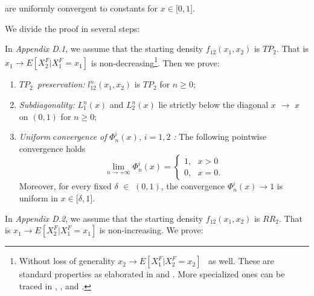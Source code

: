 \documentclass[onecolumn]{article}
\begin{document}
are uniformly convergent to constants for $x\in \lbrack 0,1]$.

We divide the proof in several steps:

In \textit{Appendix D.1}, we assume that the starting density $%
f_{12}(x_{1},x_{2})$ is $TP_{2}$. That is $x_{1}\rightarrow
E[X_{2}^{F}|X_{1}^{F}=x_{1}]$ is non-decreasing\footnote{{\footnotesize %
Without loss of generality }$x_{2}\rightarrow E[X_{1}^{F}|X_{2}^{F}=x_{2}]$%
{\footnotesize \ as well. These are standard properties as elaborated in 
\cite{[36]} and \cite{[38]}. More specialized ones can be traced in \cite%
{[32]}, \cite{[39]}, and \cite{[40]}.}}. Then we prove:

\begin{enumerate}
\item $TP_{2}$\emph{\ preservation: }$l_{12}^{n}(x_{1},x_{2})$ is $TP_{2}$
for $n\geq 0;$

\item \emph{Subdiagonality:} $L_{1}^{n}(x)$ and $L_{2}^{n}(x)$ lie strictly
below the diagonal $x$ $\rightarrow $ $x$ on $(0,1)$ for $n\geq 0;$

\item \emph{Uniform} c\emph{onvergence of }$\Phi _{n}^{i}(x)$\emph{, }$i=1,2$%
\emph{: }The following pointwise convergence holds%
\begin{equation}
\lim_{n\rightarrow +\infty }\Phi _{n}^{i}(x)=\left\{ 
\begin{array}{c}
1,\text{ }x>0 \\ 
0,\text{ }x=0.%
\end{array}%
\right.  \label{301}
\end{equation}%
Moreover, for every fixed $\delta $ $\in $ $(0,1)$, the convergence $\Phi
_{n}^{i}(x)\rightarrow 1$ is uniform in $x\in \lbrack \delta ,1]$.
\end{enumerate}

In \textit{Appendix D.2}, we assume that the starting density $%
f_{12}(x_{1},x_{2})$ is $RR_{2}$. That is $x_{1}\rightarrow
E[X_{2}^{F}|X_{1}^{F}=x_{1}]$ is non-increasing. We prove:
\end{document}

